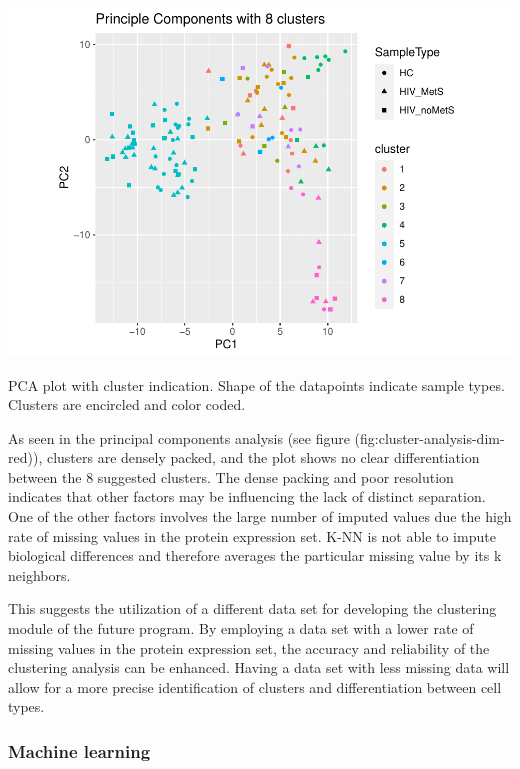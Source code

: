 \documentclass[
  11pt,
]{article}
\let\origfigure\figure
\begin{document}
\bgroup  \origfigure[H] 

{\centering \includegraphics[width=0.9\linewidth]{Thesis_files/figure-latex/cluster-analysis-dim-red-1} 

}

\caption{PCA plot with cluster indication. Shape of the datapoints indicate sample types. Clusters are encircled and color coded.}\label{fig:cluster-analysis-dim-red}
 \endfigure\egroup

As seen in the principal components analysis (see figure (fig:cluster-analysis-dim-red)), clusters are densely packed, and the plot shows no clear differentiation between the 8 suggested clusters. The dense packing and poor resolution indicates that other factors may be influencing the lack of distinct separation. One of the other factors involves the large number of imputed values due the high rate of missing values in the protein expression set. K-NN is not able to impute biological differences and therefore averages the particular missing value by its k neighbors.

This suggests the utilization of a different data set for developing the clustering module of the future program. By employing a data set with a lower rate of missing values in the protein expression set, the accuracy and reliability of the clustering analysis can be enhanced. Having a data set with less missing data will allow for a more precise identification of clusters and differentiation between cell types.

\hypertarget{machine-learning}{%
\subsubsection{Machine learning}\label{machine-learning}}
\end{document}
